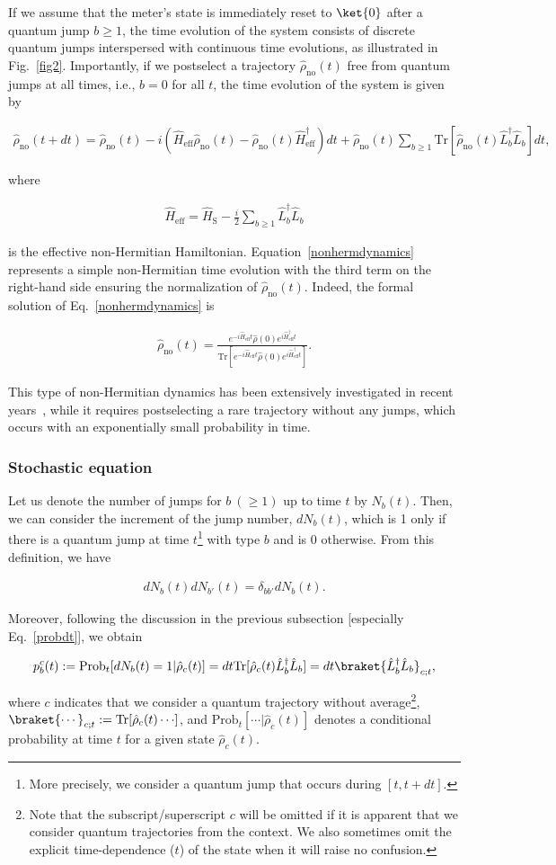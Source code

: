 \documentclass[preprint,pteplogo]{ptephy_v2}%
\numberwithin{equation}{section}
\theoremstyle{definition}
\newcommand{\mr}[1]{\mathrm{#1}}
\newcommand{\lrs}[1]{\left( #1 \right)}
\newcommand{\aln}[1]{
\begin{align}
#1
\end{align}
}
\newcommand{\Tr}{\mr{Tr}}
\begin{document}
If we assume that the meter's state is immediately reset to $\ket{0}$ after a quantum jump $b\geq1$, the time evolution of the system consists of discrete quantum jumps interspersed with continuous time evolutions, as illustrated in Fig.~\ref{fig2}.
Importantly, if we postselect a trajectory $\hat{\rho}_\mr{no}(t)$ free from quantum jumps at all times, i.e., $b=0$ for all $t$, the time evolution of the system is given by 
\aln{\label{nonhermdynamics}
\hat{\rho}_\mr{no}(t+dt)=\hat{\rho}_\mr{no}(t)-i\lrs{\hat{H}_\mr{eff}\hat{\rho}_\mr{no}(t)-\hat{\rho}_\mr{no}(t)\hat{H}_\mr{eff}^\dag}dt+\hat{\rho}_\mr{no}(t)\sum_{b\geq 1}\Tr[\hat{\rho}_\mr{no}(t)\hat{L}_b^\dag\hat{L}_b]dt,
}
where 
\aln{
\hat{H}_\mr{eff}=\hat{H}_\mr{S}-\frac{i}{2}\sum_{b\geq 1}\hat{L}_b^\dag\hat{L}_b
}
is the effective non-Hermitian Hamiltonian.
Equation~\eqref{nonhermdynamics} represents a simple non-Hermitian time evolution with the third term on the right-hand side ensuring the normalization of $\hat{\rho}_\mathrm{no}(t)$.
Indeed, the formal solution of Eq.~\eqref{nonhermdynamics} is 
\aln{
\hat{\rho}_\mr{no}(t)=\frac{e^{-i\hat{H}_\mr{eff} t}\hat{\rho}(0)e^{i\hat{H}_\mr{eff}^\dag t}}{\Tr[e^{-i\hat{H}_\mr{eff} t}\hat{\rho}(0)e^{i\hat{H}_\mr{eff}^\dag t}]}.
}
This type of non-Hermitian dynamics has been extensively investigated in recent years~\cite{ashida2020non}, while it requires postselecting a rare trajectory without any jumps, which occurs with an exponentially small probability in time.


\subsubsection{Stochastic equation}
Let us denote the number of jumps for $b\:(\geq 1)$ up to time $t$ by $N_b(t)$.
Then, we can consider the increment of the jump number, $dN_b(t)$, which is 1 only if there is a quantum jump at time $t$\footnote{
More precisely, we consider a quantum jump that occurs during $[t,t+dt]$.
} with type $b$ and is 0 otherwise.
From this definition, we have
\aln{
dN_b(t) dN_{b'}(t)=\delta_{bb'}dN_b(t).
}
Moreover, following the discussion in the previous subsection [especially Eq.~\eqref{probdt}], we obtain
\aln{\label{conditional}
p_b^c(t):=\mr{Prob}_t[dN_b(t)=1|\hat{\rho}_c(t)]=dt\mr{Tr}[\hat{\rho}_c(t)\hat{L}_b^\dag\hat{L}_b]=dt\braket{\hat{L}_b^\dag\hat{L}_b}_{c;t},
}
where $c$ indicates that we consider a quantum trajectory without average\footnote{
Note that the subscript/superscript $c$ will be omitted if it is apparent that we consider quantum trajectories from the context. 
We also sometimes omit the explicit time-dependence ($t$) of the state when it will raise no confusion.
}, $\braket{\cdots}_{c;t}:=\mr{Tr}[{\hat{\rho}_c(t)\cdots}]$, and $\mr{Prob}_t[\cdots|\hat{\rho}_c(t)]$ denotes a conditional probability at time $t$ for a given state $\hat{\rho}_c(t)$.
\end{document}
